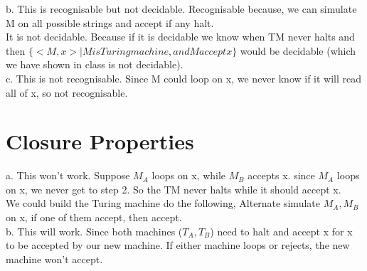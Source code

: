 \documentclass[12pt]{article}
\begin{document}
b. This is recognisable but not decidable. Recognisable because, we can simulate M on all possible strings and accept if any halt.\\ It is not decidable. Because if it is decidable we know when TM never halts and then $\{<M,x>| M is Turing machine, and M accept x\}$ would be decidable (which we have shown in class is not decidable).\\

c. This is not recognisable. Since M could loop on x, we never know if it will read all of x, so not recognisable.





\pagebreak
\section{Closure Properties}
a. This won't work. Suppose $M_A$ loops on x, while $M_B$ accepts x.  since $M_A$ loops on x, we never get to step 2. So the TM never halts while it should accept x.\\
We could build the Turing machine do the following, Alternate simulate $M_A, M_B$ on x, if one of them accept, then accept.\\

b. This will work. Since both machines ($T_A,T_B$) need to halt and accept x for x to be accepted by our new machine. If either machine loops or rejects, the new machine won't accept.
\end{document}

